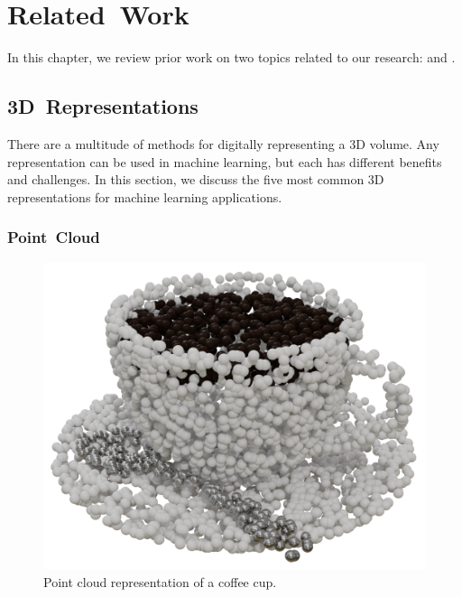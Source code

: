 
\chapter{Related~Work}
\label{chap:related_work}

In this chapter, we review prior work on two topics related to our research:  and .

\section{3D~Representations}
\label{sec:3d_representations}

There are a multitude of methods for digitally representing a 3D volume. Any representation can be used in machine learning, but each has different benefits and challenges. In this section, we discuss the five most common 3D representations for machine learning applications.


\subsection{Point~Cloud}
\label{subsec:point_cloud}

\begin{figure}[ht]
	\centering
	\includegraphics[scale=0.2]{Images/Point Cloud Cup}
	\caption{Point cloud representation of a coffee cup.}
	\label{fig:point_cloud_cup}
\end{figure}

